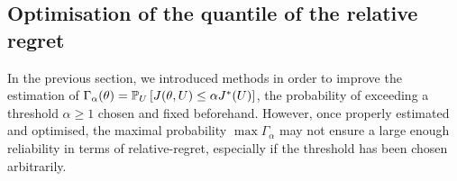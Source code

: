 \documentclass[../../Main_ManuscritThese.tex]{subfiles}
\begin{document}



\clearpage

\subsection{Optimisation of the quantile of the relative regret}
\label{sec:quantile_rr}
In the previous section, we introduced methods in order to improve the
estimation of
$\Gamma_{\alpha}(\theta)= \mathbb{P}_{U}\left[J(\theta, U) \leq \alpha
  J^*(U)\right]$, the probability of exceeding a threshold
$\alpha \geq 1$ chosen and fixed beforehand.
However, once properly estimated and optimised, the maximal
probability $\max \Gamma_{\alpha}$ may not ensure a large enough
reliability in terms of relative-regret, especially if the threshold
has been chosen arbitrarily.
\end{document}
